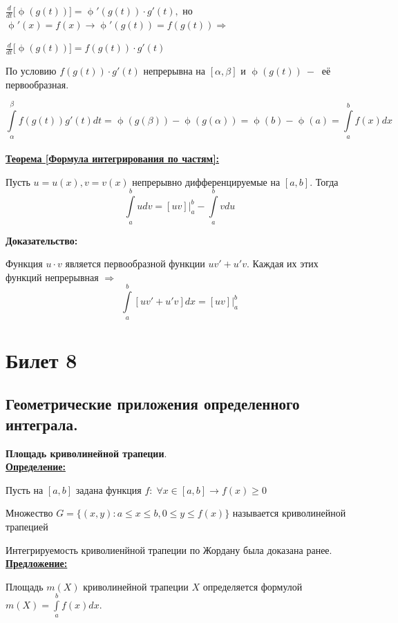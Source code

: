 \documentclass[a4paper,12pt]{article} %
\begin{document}
$\frac{d}{dt}\Big[\upphi(g(t))\Big]= \upphi'(g(t))\cdot g'(t),$ но $\upphi'(x) = f(x) \rightarrow \upphi'(g(t))= f(g(t))\Rightarrow$

$\frac{d}{dt}\Big[\upphi(g(t))\Big]=f(g(t))\cdot g'(t)$

По условию $f(g(t))\cdot g'(t)$ непрерывна на $[\alpha, 
\beta]$ и $\upphi(g(t))~-~$ её первообразная.

$$\int\limits_\alpha^\beta f(g(t))g'(t)dt = \upphi(g(\beta))- \upphi(g(\alpha))= \upphi(b) - \upphi(a) = \int\limits_a^b f(x)dx $$\\

\underline{\textbf{Теорема [Формула интегрирования по частям]:}}

Пусть $u = u(x), v= v(x)$ непрерывно дифференцируемые на $[a,b]$. Тогда $$\int\limits_a^b udv = [uv]|^b_a - \int\limits_a^b vdu$$

\textbf{Доказательство:}

Функция $u \cdot v$ является первообразной функции $uv'+u'v$. Каждая их этих функций непрерывная $\Rightarrow$
$$\int\limits_a^b[uv'+u'v]dx = [uv]|^b_a$$


\newpage
\section{Билет 8}

\subsection{Геометрические приложения определенного интеграла.}

\noindent \textbf{Площадь криволинейной трапеции}.\\

\underline{\textbf{Определение:}}


Пусть на $[a, b]$ задана функция $f:\; \forall x \in[a, b] \rightarrow f(x) \geq 0$

Множество $G=\{(x,y): a\leq x \leq b, 0 \leq y \leq f(x)\}$ называется криволинейной трапецией

Интегрируемость криволиенйной трапеции по Жордану была доказана ранее.\\

\underline{\textbf{Предложение:}}

Площадь $m(X)$ криволинейной трапеции $X$ определяется формулой $m(X) = \int\limits_a^b f(x)dx$.\\
\end{document}
